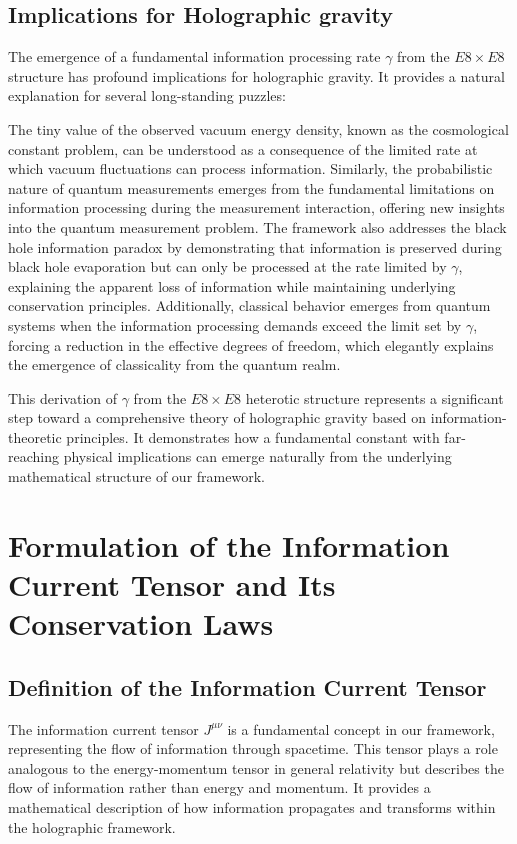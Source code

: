 \documentclass[11pt,english,twoside]{article}
\begin{document}
\subsection{Implications for Holographic gravity}

The emergence of a fundamental information processing rate $\gamma$ from the $E8\times E8$ structure has profound implications for holographic gravity. It provides a natural explanation for several long-standing puzzles:

The tiny value of the observed vacuum energy density, known as the cosmological constant problem, can be understood as a consequence of the limited rate at which vacuum fluctuations can process information. Similarly, the probabilistic nature of quantum measurements emerges from the fundamental limitations on information processing during the measurement interaction, offering new insights into the quantum measurement problem. The framework also addresses the black hole information paradox by demonstrating that information is preserved during black hole evaporation but can only be processed at the rate limited by $\gamma$, explaining the apparent loss of information while maintaining underlying conservation principles. Additionally, classical behavior emerges from quantum systems when the information processing demands exceed the limit set by $\gamma$, forcing a reduction in the effective degrees of freedom, which elegantly explains the emergence of classicality from the quantum realm.

This derivation of $\gamma$ from the $E8\times E8$ heterotic structure represents a significant step toward a comprehensive theory of holographic gravity based on information-theoretic principles. It demonstrates how a fundamental constant with far-reaching physical implications can emerge naturally from the underlying mathematical structure of our framework.

\section{Formulation of the Information Current Tensor and Its Conservation Laws}

\subsection{Definition of the Information Current Tensor}

The information current tensor $J^{\mu\nu}$ is a fundamental concept in our framework, representing the flow of information through spacetime. This tensor plays a role analogous to the energy-momentum tensor in general relativity but describes the flow of information rather than energy and momentum. It provides a mathematical description of how information propagates and transforms within the holographic framework.
\end{document}
